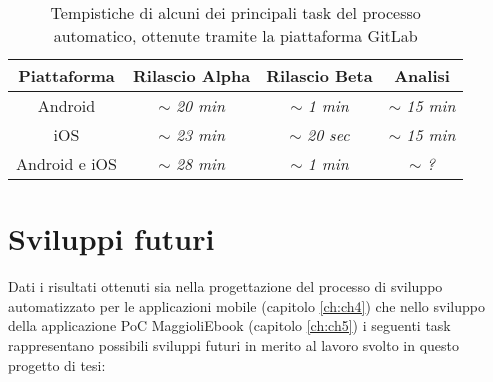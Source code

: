 


\begin{table}[H]
\centering
    \begin{tabular}{|c|c|c|c|}
         \hline
         \textbf{Piattaforma} & \textbf{Rilascio Alpha} & \textbf{Rilascio Beta} & \textbf{Analisi}\\
         \hline
         Android & $\sim$ \textit{20 min} & $\sim$ \textit{1 min} & $\sim$ \textit{15 min} \\
         \hline
         iOS & $\sim$ \textit{23 min} & $\sim$ \textit{20 sec} & $\sim$ \textit{15 min} \\
         \hline
         Android e iOS & $\sim$ \textit{28 min} & $\sim$ \textit{1 min} & $\sim$ \textit{?} \\
         \hline
    \end{tabular}
    \caption{Tempistiche di alcuni dei principali task del processo automatico, ottenute tramite la piattaforma GitLab}
\end{table}

\section{Sviluppi futuri}
Dati i risultati ottenuti sia nella progettazione del processo di sviluppo automatizzato per le applicazioni mobile (capitolo \ref{ch:ch4}) che nello sviluppo della applicazione PoC MaggioliEbook (capitolo \ref{ch:ch5}) i seguenti task rappresentano possibili sviluppi futuri in merito al lavoro svolto in questo progetto di tesi:

